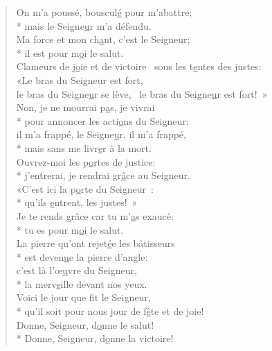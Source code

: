 \begin{verse}
On m’a poussé, bouscul\underline{é} pour m’abattre; \\*
mais le Seigne\underline{u}r m’a défendu. \\
Ma force et mon ch\underline{a}nt, c’est le Seigneur; \\*
il est pour m\underline{o}i le salut. \\

Clameurs de j\underline{o}ie et de victoire~\psalmstar
sous les t\underline{e}ntes des justes: \\
«Le bras du Seigneur est fort, \\
le bras du Seigne\underline{u}r se lève,~\psalmstar
le bras du Seigne\underline{u}r est fort! » \\

Non, je ne mourrai p\underline{a}s, je vivrai \\*
pour annoncer les acti\underline{o}ns du Seigneur: \\
il m’a frappé, le Seigne\underline{u}r, il m’a frappé, \\*
mais sans me livr\underline{e}r à la mort. \\

Ouvrez-moi les p\underline{o}rtes de justice: \\*
j’entrerai, je rendrai gr\underline{â}ce au Seigneur. \\
«C’est ici la p\underline{o}rte du Seigneur : \\*
qu’ils \underline{e}ntrent, les justes! » \\
Je te rends grâce car tu m’\underline{a}s exaucé: \\*
tu es pour m\underline{o}i le salut. \\

La pierre qu’ont rejet\underline{é}e les bâtisseurs \\*
est deven\underline{u}e la pierre d’angle: \\
c’est là l’œ\underline{u}vre du Seigneur, \\*
la merv\underline{e}ille devant nos yeux. \\
Voici le jour que f\underline{i}t le Seigneur, \\*
qu’il soit pour nous jour de f\underline{ê}te et de joie! \\

Donne, Seigneur, d\underline{o}nne le salut! \\*
Donne, Seigneur, d\underline{o}nne la victoire! \\


\end{verse}
